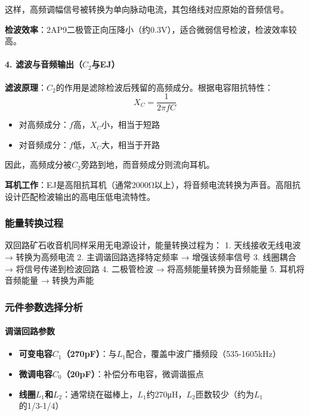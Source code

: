 \documentclass[12pt,UTF8]{ctexbook}
\begin{document}
这样，高频调幅信号被转换为单向脉动电流，其包络线对应原始的音频信号。

\textbf{检波效率}：2AP9二极管正向压降小（约0.3V），适合微弱信号检波，检波效率较高。

\paragraph{4. 滤波与音频输出（$C_2$与EJ）}

\textbf{滤波原理}：$C_2$的作用是滤除检波后残留的高频成分。根据电容阻抗特性：
\[ X_C = \frac{1}{2\pi fC} \]
\begin{itemize}
  \item 对高频成分：$f$高，$X_C$小，相当于短路
  \item 对音频成分：$f$低，$X_C$大，相当于开路\end{itemize}

因此，高频成分被$C_2$旁路到地，而音频成分则流向耳机。

\textbf{耳机工作}：EJ是高阻抗耳机（通常2000Ω以上），将音频电流转换为声音。高阻抗设计匹配检波输出的高电压低电流特性。

\subsubsection{能量转换过程}

双回路矿石收音机同样采用无电源设计，能量转换过程为：
1. 天线接收无线电波 → 转换为高频电流
2. 主调谐回路选择特定频率 → 增强该频率信号
3. 线圈耦合 → 将信号传递到检波回路
4. 二极管检波 → 将高频能量转换为音频能量
5. 耳机将音频能量 → 转换为声能

\subsubsection{元件参数选择分析}

\paragraph{调谐回路参数}\begin{itemize}
  \item \textbf{可变电容$C_1$（270pF）}：与$L_1$配合，覆盖中波广播频段（535-1605kHz）
  \item \textbf{微调电容$C_0$（20pF）}：补偿分布电容，微调谐振点
  \item \textbf{线圈$L_1$和$L_2$}：通常绕在磁棒上，$L_1$约270μH，$L_2$匝数较少（约为$L_1$的1/3-1/4）\end{itemize}
\end{document}
